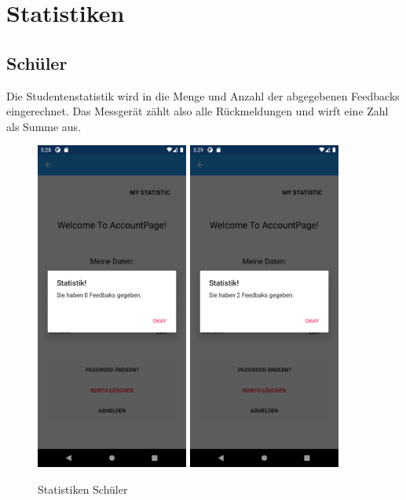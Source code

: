 \section{Statistiken}
\subsection{Schüler}
Die Studentenstatistik wird in die Menge und Anzahl der abgegebenen Feedbacks eingerechnet. Das Messgerät zählt also alle Rückmeldungen und wirft eine Zahl als Summe aus.
\begin{figure}[h]
    \begin{center}
        \includegraphics[width=5cm]{pics/Xamarin Student/27 Stat.png}\hfill
        \includegraphics[width=5cm]{pics/Xamarin Student/28 Stat.png}
        \caption[Statistiken]{Statistiken Schüler}
        \end{center}
\end{figure}
\newpage
